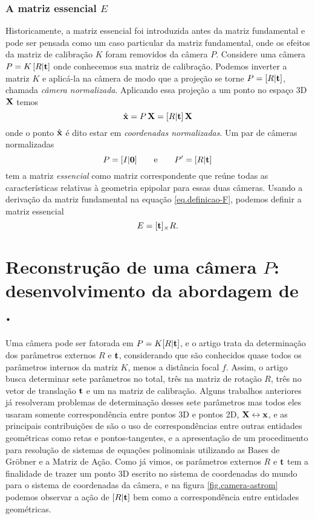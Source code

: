 \subsubsection*{A matriz essencial $E$}
Historicamente, a matriz essencial foi introduzida antes da matriz fundamental e pode ser pensada como um caso particular da matriz fundamental, onde os efeitos da matriz de calibração $K$ foram removidos da câmera $P$. Considere uma câmera $P=K\,[R|{\bf t}]$ onde conhecemos sua matriz de calibração. Podemos inverter a matriz $K$ e aplicá-la na câmera de modo que a projeção se torne $P=[R|{\bf t}]$, chamada {\it câmera normalizada}. Aplicando essa projeção a um ponto no espaço 3D $\mathbf{X}$ temos 
\begin{equation*}
\hat{\mathbf{x}}=P\,\mathbf{X}=[R|{\bf t}]\,\mathbf{X}
\end{equation*}
onde o ponto $\hat{\mathbf{x}}$ é dito estar em {\it coordenadas  normalizadas}. Um par de câmeras normalizadas 
\begin{equation*}
P=[I|{\bf 0}]\qquad\text{e}\qquad P'=[R|{\bf t}]
\end{equation*}
tem a matriz {\it essencial} como matriz correspondente que reúne todas as características relativas à geometria epipolar para essas duas câmeras. Usando a derivação da matriz fundamental na equação \ref{eq.definicao-F}, podemos definir a matriz essencial
\begin{equation*}
E=[{\bf t}]_\times R.
\end{equation*}

\section{Reconstrução de uma câmera $P$: desenvolvimento da abordagem de \citep{bib:kuang}.}\label{sec.astrom}
Uma câmera pode ser fatorada em $P=K[R|{\bf t}]$, e o artigo \citep{bib:kuang} trata da determinação dos parâmetros externos $R$ e ${\bf t}$, considerando que são conhecidos quase todos os parâmetros internos da matriz $K$, menos a distância focal $f$. Assim, o artigo busca determinar sete parâmetros no total, três na matriz de rotação $R$, três no vetor de translação ${\bf t}$ e um na matriz de calibração. Alguns trabalhos anteriores já resolveram problemas de determinação desses sete parâmetros mas todos eles usaram somente correspondência entre pontos 3D e pontos 2D, $\mathbf{X}\leftrightarrow\mathbf{x}$, e as principais contribuições de \citep{bib:kuang} são o uso de correspondências entre outras entidades geométricas como retas e pontos-tangentes, e a apresentação de um procedimento para resolução de sistemas de equações polinomiais utilizando as Bases de Gr\"obner e a Matriz de Ação. Como já vimos, os parâmetros externos $R$ e ${\bf t}$ tem a finalidade de trazer um ponto 3D escrito no sistema de coordenadas do mundo para o sistema de coordenadas da câmera, e na figura \ref{fig.camera-astrom} podemos observar a ação de $[R|{\bf t}]$ bem como a correspondência entre entidades geométricas.

